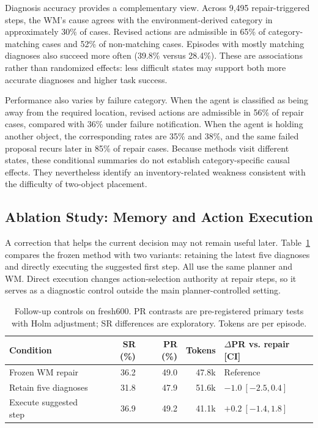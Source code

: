 \documentclass[runningheads]{llncs}
\begin{document}
Diagnosis accuracy provides a complementary view. Across 9,495 repair-triggered steps, the WM's cause agrees with the environment-derived category in approximately 30\% of cases. Revised actions are admissible in 65\% of category-matching cases and 52\% of non-matching cases. Episodes with mostly matching diagnoses also succeed more often (39.8\% versus 28.4\%). These are associations rather than randomized effects: less difficult states may support both more accurate diagnoses and higher task success.

Performance also varies by failure category. When the agent is classified as being away from the required location, revised actions are admissible in 56\% of repair cases, compared with 36\% under failure notification. When the agent is holding another object, the corresponding rates are 35\% and 38\%, and the same failed proposal recurs later in 85\% of repair cases. Because methods visit different states, these conditional summaries do not establish category-specific causal effects. They nevertheless identify an inventory-related weakness consistent with the difficulty of two-object placement.

\subsection{Ablation Study: Memory and Action Execution}
A correction that helps the current decision may not remain useful later. Table~\ref{tab:followups} compares the frozen method with two variants: retaining the latest five diagnoses and directly executing the suggested first step. All use the same planner and WM. Direct execution changes action-selection authority at repair steps, so it serves as a diagnostic control outside the main planner-controlled setting.

\begin{table}[tbp]
\caption{Follow-up controls on fresh600. PR contrasts are pre-registered primary tests with Holm adjustment; SR differences are exploratory. Tokens are per episode.}
\label{tab:followups}\centering
\begin{tabular}{lrrrl}\toprule
Condition & SR (\%) & PR (\%) & Tokens & $\Delta$PR vs. repair [CI]\\\midrule
Frozen WM repair & 36.2 & 49.0 & 47.8k & Reference\\
Retain five diagnoses & 31.8 & 47.9 & 51.6k & $-1.0\ [-2.5,0.4]$\\
Execute suggested step & 36.9 & 49.2 & 41.1k & $+0.2\ [-1.4,1.8]$\\\bottomrule
\end{tabular}
\end{table}
\end{document}
